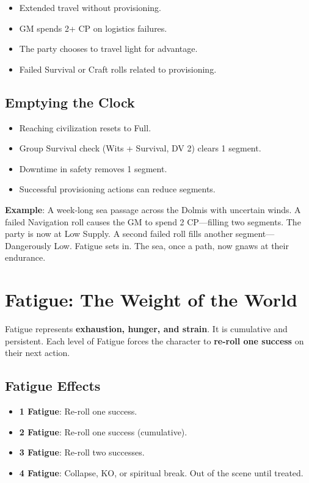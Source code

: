 \begin{itemize}
    \item Extended travel without provisioning.
    \item GM spends 2+ CP on logistics failures.
    \item The party chooses to travel light for advantage.
    \item Failed Survival or Craft rolls related to provisioning.
\end{itemize}

\subsection*{Emptying the Clock}

\begin{itemize}
    \item Reaching civilization resets to Full.
    \item Group Survival check (Wits + Survival, DV 2) clears 1 segment.
    \item Downtime in safety removes 1 segment.
    \item Successful provisioning actions can reduce segments.
\end{itemize}

\textbf{Example}: A week-long sea passage across the Dolmis with uncertain winds. A failed Navigation roll causes the GM to spend 2 CP---filling two segments. The party is now at Low Supply. A second failed roll fills another segment---Dangerously Low. Fatigue sets in. The sea, once a path, now gnaws at their endurance.

\section*{Fatigue: The Weight of the World}

Fatigue represents \textbf{exhaustion, hunger, and strain}. It is cumulative and persistent. Each level of Fatigue forces the character to \textbf{re-roll one success} on their next action.

\subsection*{Fatigue Effects}

\begin{itemize}
    \item \textbf{1 Fatigue}: Re-roll one success.
    \item \textbf{2 Fatigue}: Re-roll one success (cumulative).
    \item \textbf{3 Fatigue}: Re-roll two successes.
    \item \textbf{4 Fatigue}: Collapse, KO, or spiritual break. Out of the scene until treated.
\end{itemize}

